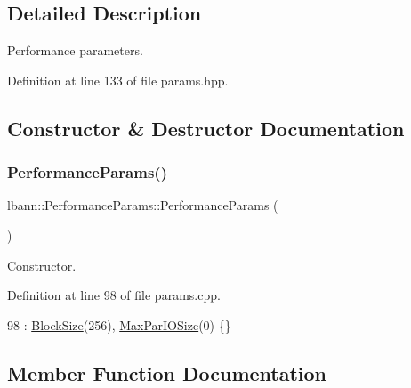 \subsection{Detailed Description}
Performance parameters. 

Definition at line 133 of file params.\+hpp.



\subsection{Constructor \& Destructor Documentation}
\mbox{\label{classlbann_1_1PerformanceParams_a1c8f2276e83effdf28e6be3ac0da91c0}} 
\subsubsection{\texorpdfstring{Performance\+Params()}{PerformanceParams()}}
{\footnotesize\ttfamily lbann\+::\+Performance\+Params\+::\+Performance\+Params (\begin{DoxyParamCaption}{ }\end{DoxyParamCaption})}



Constructor. 



Definition at line 98 of file params.\+cpp.


\begin{DoxyCode}
98 : \hyperlink{classlbann_1_1PerformanceParams_af982cb94a2e7f01f45ff9ca80e9f8685}{BlockSize}(256), \hyperlink{classlbann_1_1PerformanceParams_a6869434b1b4ff69d91f2998f9d194a8f}{MaxParIOSize}(0) \{\}
\end{DoxyCode}


\subsection{Member Function Documentation}
\mbox{\label{classlbann_1_1PerformanceParams_abde9f8ab7421f863f11542721c93768f}} 
